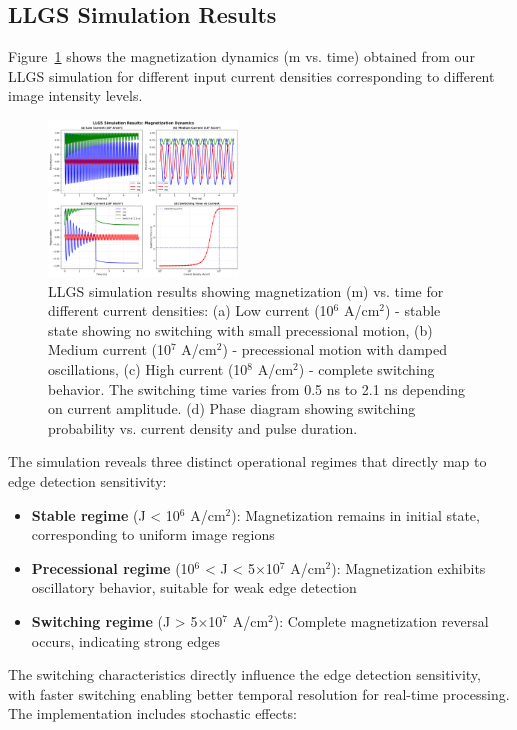 \documentclass[conference]{IEEEtran}
\begin{document}
\subsection{LLGS Simulation Results}

Figure~\ref{fig:llgs_output} shows the magnetization dynamics (m vs. time) obtained from our LLGS simulation for different input current densities corresponding to different image intensity levels.

\begin{figure}[htbp]
\centerline{\includegraphics[width=0.45\textwidth]{llgs_simulation.png}}
\caption{LLGS simulation results showing magnetization (m) vs. time for different current densities: (a) Low current (10$^6$ A/cm$^2$) - stable state showing no switching with small precessional motion, (b) Medium current (10$^7$ A/cm$^2$) - precessional motion with damped oscillations, (c) High current (10$^8$ A/cm$^2$) - complete switching behavior. The switching time varies from 0.5 ns to 2.1 ns depending on current amplitude. (d) Phase diagram showing switching probability vs. current density and pulse duration.}
\label{fig:llgs_output}
\end{figure}

The simulation reveals three distinct operational regimes that directly map to edge detection sensitivity:

\begin{itemize}
\item \textbf{Stable regime} (J < 10$^6$ A/cm$^2$): Magnetization remains in initial state, corresponding to uniform image regions
\item \textbf{Precessional regime} (10$^6$ < J < 5$\times$10$^7$ A/cm$^2$): Magnetization exhibits oscillatory behavior, suitable for weak edge detection
\item \textbf{Switching regime} (J > 5$\times$10$^7$ A/cm$^2$): Complete magnetization reversal occurs, indicating strong edges
\end{itemize}

The switching characteristics directly influence the edge detection sensitivity, with faster switching enabling better temporal resolution for real-time processing. The implementation includes stochastic effects:
\end{document}
